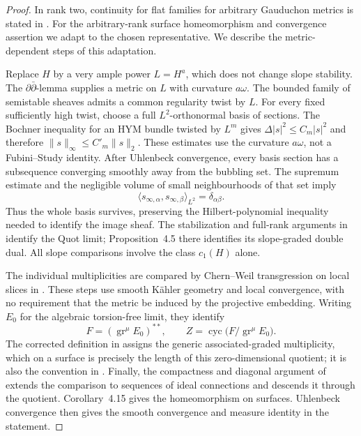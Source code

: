 \begin{proof}
In rank two, continuity for flat families for arbitrary Gauduchon metrics
is stated in \cite[Theorem~2.2]{BTT17}. For the arbitrary-rank surface
homeomorphism and convergence assertion we adapt
\cite[Theorem~4.11 and Corollary~4.15]{GSTW21} to the chosen representative.
We describe the metric-dependent steps of this adaptation.

Replace $H$ by a very ample power $L=H^a$, which does not change slope
stability. The $\partial\bar\partial$-lemma supplies a metric on $L$
with curvature $a\omega$. The bounded family of semistable sheaves admits
a common regularity twist by $L$. For every fixed sufficiently high twist,
choose a full $L^2$-orthonormal basis of sections. The Bochner inequality
for an HYM bundle twisted by $L^m$ gives
$\Delta|s|^2\le C_m|s|^2$ and therefore
$\|s\|_\infty\le C'_m\|s\|_2$. These estimates use the curvature
$a\omega$, not a Fubini--Study identity.
After Uhlenbeck convergence, every basis section has a subsequence
converging smoothly away from the bubbling set. The supremum estimate and
the negligible volume of small neighbourhoods of that set imply
\[
 \langle s_{\infty,\alpha},s_{\infty,\beta}\rangle_{L^2}
                    =\delta_{\alpha\beta}.
\]
Thus the whole basis survives, preserving the Hilbert-polynomial
inequality needed to identify the image sheaf. The stabilization and
full-rank arguments in \cite[Lemmas~4.3--4.4]{GSTW21} identify the Quot
limit; Proposition~4.5 there identifies its slope-graded double dual.
All slope comparisons involve the class $c_1(H)$ alone.

The individual multiplicities are compared by Chern--Weil transgression
on local slices in \cite[Propositions~4.7 and 4.9]{GSTW21}. These steps
use smooth K\"ahler geometry and local convergence, with no requirement
that the metric be induced by the projective embedding. Writing $E_0$ for the algebraic torsion-free limit, they identify
\[
 F=(\operatorname{gr}^{\mu}E_0)^{**},\qquad
 Z=\operatorname{cyc}\big(F/\operatorname{gr}^{\mu}E_0\big).
\]
The corrected definition in \cite[Erratum]{SW15} assigns the generic
associated-graded multiplicity, which on a surface is precisely the
length of this zero-dimensional quotient; it is also the convention in
\cite[Section~2.5.3]{GSTW21}.
Finally, the compactness and diagonal argument of
\cite[Proposition~4.13 and Theorem~4.11]{GSTW21} extends the comparison to
sequences of ideal connections and descends it through the quotient.
Corollary~4.15 gives the homeomorphism on surfaces. Uhlenbeck convergence
then gives the smooth convergence and measure identity in the statement.
\end{proof}

